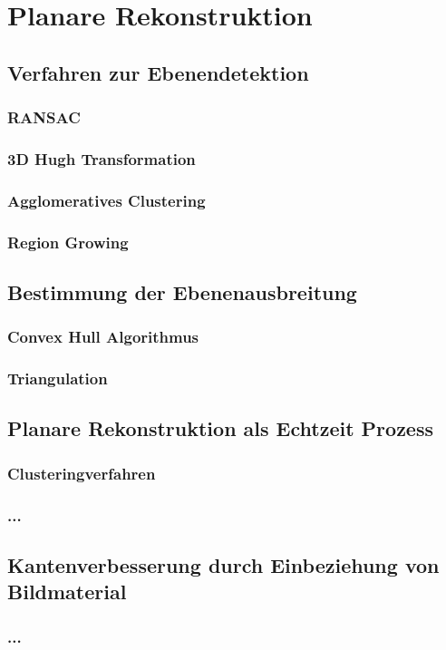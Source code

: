 \section{Planare Rekonstruktion}

\subsection{Verfahren zur Ebenendetektion}

\subsubsection{RANSAC}

\subsubsection{3D Hugh Transformation}

\subsubsection{Agglomeratives Clustering}

\subsubsection{Region Growing}

\subsection{Bestimmung der Ebenenausbreitung}

\subsubsection{Convex Hull Algorithmus}

\subsubsection{Triangulation}

\subsection{Planare Rekonstruktion als Echtzeit Prozess}

\subsubsection{Clusteringverfahren}

\subsubsection{...}

\subsection{Kantenverbesserung durch Einbeziehung von Bildmaterial}

\subsubsection{...}